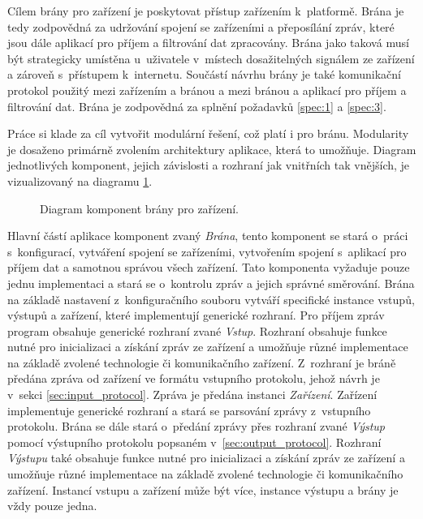 \label{sec:gateway_design}
Cílem brány pro zařízení je poskytovat přístup zařízením k~platformě. Brána je tedy zodpovědná za udržování spojení se zařízeními a přeposílání zpráv, které jsou dále aplikací pro příjem a filtrování dat zpracovány. Brána jako taková musí být strategicky umístěna u~uživatele v~místech dosažitelných signálem ze zařízení a zároveň s~přístupem k~internetu. Součástí návrhu brány je také komunikační protokol použitý mezi zařízením a bránou a mezi bránou a aplikací pro příjem a filtrování dat. Brána je zodpovědná za splnění požadavků \ref{spec:1} a \ref{spec:3}.

Práce si klade za cíl vytvořit modulární řešení, což platí i pro bránu. Modularity je dosaženo primárně zvolením architektury aplikace, která to umožňuje. Diagram jednotlivých komponent, jejich závislosti a rozhraní jak vnitřních tak vnějších, je vizualizovaný na diagramu \ref{dia:gateway_architecture}.

\begin{figure}[ht]
  \centering
  
  \caption{Diagram komponent brány pro zařízení.}
  \label{dia:gateway_architecture}
\end{figure}

Hlavní částí aplikace komponent zvaný \textit{Brána}, tento komponent se stará o~práci s~konfigurací, vytváření spojení se zařízeními, vytvořením spojení s~aplikací pro příjem dat a samotnou správou všech zařízení. Tato komponenta vyžaduje pouze jednu implementaci a stará se o~kontrolu zpráv a jejich správné směrování. Brána na základě nastavení z~konfiguračního souboru vytváří specifické instance vstupů, výstupů a zařízení, které implementují generické rozhraní. Pro příjem zpráv program obsahuje generické rozhraní zvané \textit{Vstup}. Rozhraní obsahuje funkce nutné pro inicializaci a získání zpráv ze zařízení a umožňuje různé implementace na základě zvolené technologie či komunikačního zařízení. Z~rozhraní je bráně předána zpráva od zařízení ve formátu vstupního protokolu, jehož návrh je v~sekci \ref{sec:input_protocol}. Zpráva je předána instanci \textit{Zařízení}. Zařízení implementuje generické rozhraní a stará se parsování zprávy z~vstupního protokolu. Brána se dále stará o~předání zprávy přes rozhraní zvané \textit{Výstup} pomocí výstupního protokolu popsaném v~\ref{sec:output_protocol}. Rozhraní \textit{Výstupu} také obsahuje funkce nutné pro inicializaci a získání zpráv ze zařízení a umožňuje různé implementace na základě zvolené technologie či komunikačního zařízení. Instancí vstupu a zařízení může být více, instance výstupu a brány je vždy pouze jedna.

